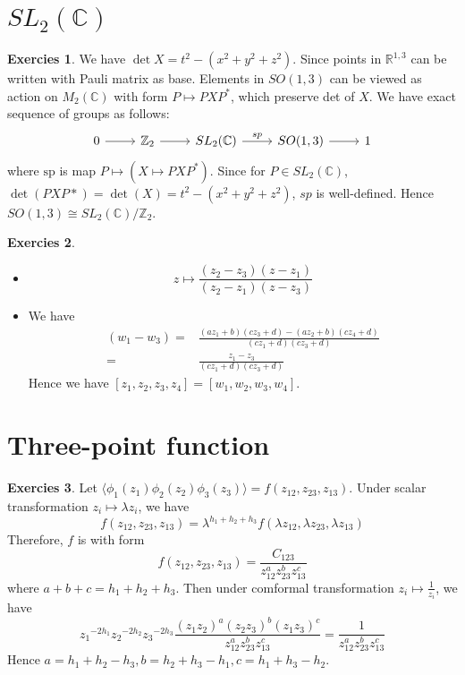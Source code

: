\documentclass[12pt,a4paper]{article}
\theoremstyle{definition}
\newtheorem{exer}{Exercies}[subsection]
\begin{document}
\section{$SL_2(\mathbb{C})$}
\begin{exer}
	We have $\det X = t^2-(x^2+y^2+z^2)$. Since points in $\mathbb{R}^{1,3}$ can be written with Pauli matrix as base. Elements in $SO(1,3)$ can be viewed as action on $M_2(\mathbb{C})$ with form $P \mapsto PXP^*$, which preserve det of $X$.
	We have exact sequence of groups as follows:
	\[\begin{tikzcd}
		0 \ar[r] &\mathbb{Z}_2 \ar[r] &SL_2(\mathbb{C}) \ar[r,"sp"]&SO(1,3) \ar[r]&1 
	\end{tikzcd}\]
	where $\text{sp}$ is map $P \mapsto (X \mapsto PXP^*)$. Since for $P \in SL_2(\mathbb{C})$, $\det(PXP*) = \det(X) = t^2-(x^2+y^2+z^2)$, $sp$ is well-defined. Hence $SO(1,3) \cong SL_2(\mathbb{C})/\mathbb{Z}_2$.
\end{exer}
\begin{exer}
	\begin{itemize}
		\item \[
		z \mapsto \frac{(z_2 -z_3)(z-z_1)}{(z_2-z_1)(z-z_3)}
		\]
		\item We have
		\[
		\begin{aligned}
		(w_1 -w_3)=&\frac{(az_1+b)(cz_3+d)-(az_2 +b)(cz_4+d)}{(cz_1+d)(cz_3+d)}\\
		=&\frac{z_1-z_3}{(cz_1+d)(cz_3+d)}
		\end{aligned}
		\]
		Hence we have $[z_1,z_2,z_3,z_4]=[w_1,w_2,w_3,w_4]$.
	\end{itemize}
\end{exer}
\section{Three-point function}
\begin{exer}
	Let $\langle\phi_1(z_1)\phi_2(z_2)\phi_3(z_3)\rangle =f(z_{12},z_{23},z_{13})$. Under scalar transformation $z_i \mapsto \lambda z_i$, we have
	\[
	f(z_{12},z_{23},z_{13})=\lambda^{h_1+h_2+h_3}f(\lambda z_{12},\lambda z_{23},\lambda z_{13})
	\]
	Therefore, $f$ is with form
	\[
	f(z_{12},z_{23},z_{13})=\frac{C_{123}}{z_{12}^a z_{23}^b z_{13}^c}
	\]
	where $a+b+c = h_1 +h_2 +h_3$.
	Then under comformal transformation $z_i \mapsto \frac{1}{z_i}$, we have
	\[
	{z_1}^{-2h_1}{z_2}^{-2h_2}{z_3}^{-2h_3} \frac{(z_1z_2)^a(z_2 z_3)^b(z_1z_3)^c}{z_{12}^a z_{23}^b z_{13}^c}= \frac{1}{z_{12}^a z_{23}^b z_{13}^c}
	\]
	Hence $a= h_1 +h_2 -h_3, b=h_2 + h_3 -h_1, c= h_1 +h_3 - h_2$.
\end{exer}
\end{document}
